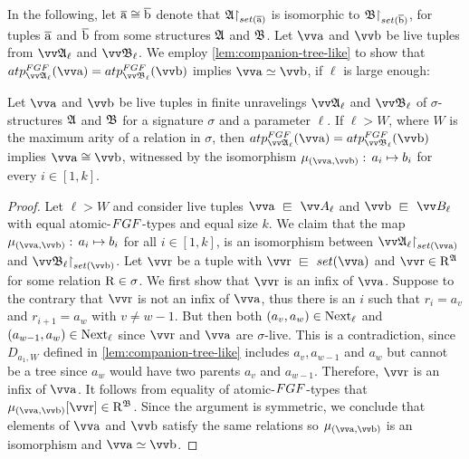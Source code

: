 In the following, let $\overline{\mathrm{a}} \cong \overline{\mathrm{b}}$ denote that $\restr{\str{A}}{\set(\elemtuplea)}$ is isomorphic to $\restr{\str{B}}{\set(\elemtupleb)}$, for tuples $\overline{\mathrm{a}}$ and $\overline{\mathrm{b}}$ from some structures ${\mathfrak{A}}$ and ${\mathfrak{B}}$.
Let $\elemtuptuplea$ and $\elemtuptupleb$ be live tuples from $\unravel{A}_{\ell}$ and $\unravel{B}_{\ell}$.
We employ \cref{lem:companion-tree-like} to show that $\atp{\FGF}{\unravel{A}_{\ell}}{\elemtuptuplea} = \atp{\FGF}{\unravel{B}_{\ell}}{\elemtuptupleb}$ implies $\elemtuptuplea \simeq \elemtuptupleb$, if $\ell$ is large enough:
\begin{lemma}\label{lem:fgf-type-iso}
  Let $\elemtuptuplea$ and $\elemtuptupleb$ be live tuples in finite unravelings $\unravel{A}_{\ell}$ and $\unravel{B}_{\ell}$ of $\sigma$-structures ${\mathfrak{A}}$ and ${\mathfrak{B}}$ for a signature $\sigma$ and a parameter $\ell$.
  If $\ell > W$, where $W$ is the maximum arity of a relation in $\sigma$, then $\atp{\FGF}{\unravel{A}_{\ell}}{\elemtuptuplea} = \atp{\FGF}{\unravel{B}_{\ell}}{\elemtuptupleb}$ implies $\elemtuptuplea \isoeq \elemtuptupleb$, witnessed by the isomorphism $\mu_{(\elemtuptuplea, \elemtuptupleb)}:\, a_{i} \mapsto b_{i}$ for every $i \in [1, k]$.
\end{lemma}
\begin{proof}
Let $\ell > W$ and consider live tuples $\elemtuptuplea \sqin \unraveldom{A}_{\ell}$ and $\elemtuptupleb \sqin \unraveldom{B}_{\ell}$ with equal atomic-$\FGF$-types and equal size $k$.
We claim that the map $\mu_{(\elemtuptuplea, \elemtuptupleb)}:\, a_{i} \mapsto b_{i}$ for all $i \in [1, k]$, is an isomorphism between $\restr{\str{\unravel{A}_{\ell}}}{\set(\elemtuptuplea)}$ and $\restr{\str{\unravel{B}_{\ell}}}{\set(\elemtuptupleb)}$.
Let $\elemtuptupler$ be a tuple with $\elemtuptupler \sqin \set(\elemtuptuplea)$ and $\elemtuptupler \in \relR^{\str{A}}$ for some relation $\mathrm{R} \in \sigma$.
We first show that $\elemtuptupler$ is an infix of $\elemtuptuplea$.
Suppose to the contrary that $\elemtuptupler$ is not an infix of $\elemtuptuplea$, thus there is an $i$ such that $r_{i} = a_{v}$ and $r_{i+1} = a_{w}$ with $v \ne w - 1$.
But then both $(a_{v}, a_{w}) \in \mathrm{Next}_{\ell}$ and $(a_{w-1}, a_{w}) \in \mathrm{Next}_{\ell}$ since $\elemtuptupler$ and $\elemtuptuplea$ are $\sigma$-live.
This is a contradiction, since $D_{a_{1}, W}$ defined in \cref{lem:companion-tree-like} includes $a_{v}, a_{w-1}$ and $a_{w}$ but cannot be a tree since $a_{w}$ would have two parents $a_{v}$ and $a_{w-1}$.
Therefore, $\elemtuptupler$ is an infix of $\elemtuptuplea$.
It follows from equality of atomic-$\FGF$-types that $\mu_{(\elemtuptuplea, \elemtuptupleb)}[\elemtuptupler] \in \relR^{\str{B}}$.
Since the argument is symmetric, we conclude that elements of $\elemtuptuplea$ and $\elemtuptupleb$ satisfy the same relations so $\mu_{(\elemtuptuplea, \elemtuptupleb)}$ is an isomorphism and $\elemtuptuplea \simeq \elemtuptupleb$.
\end{proof}


